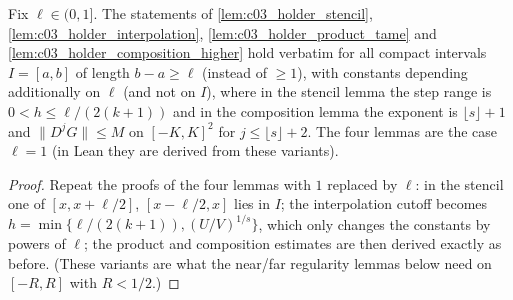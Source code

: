 \begin{lemma}
  \label{lem:c03_holder_tame_len}
  Fix $\ell\in(0,1]$. The statements of \cref{lem:c03_holder_stencil}, \cref{lem:c03_holder_interpolation},
  \cref{lem:c03_holder_product_tame} and \cref{lem:c03_holder_composition_higher} hold verbatim for all
  compact intervals $I=[a,b]$ of length $b-a\ge\ell$ (instead of $\ge1$), with constants depending
  additionally on $\ell$ (and not on $I$), where in the stencil lemma the step range is
  $0<h\le\ell/(2(k+1))$ and in the composition lemma the exponent is $\lfloor s\rfloor+1$ and
  $\|D^jG\|\le M$ on $[-K,K]^2$ for $j\le\lfloor s\rfloor+2$. The four lemmas are the case $\ell=1$ (in Lean they are derived from these variants).
\end{lemma}
\begin{proof}
  Repeat the proofs of the four lemmas with $1$ replaced by $\ell$: in the stencil one of
  $[x,x+\ell/2]$, $[x-\ell/2,x]$ lies in $I$; the interpolation cutoff becomes
  $h=\min\{\ell/(2(k+1)),(U/V)^{1/s}\}$, which only changes the constants by powers of $\ell$;
  the product and composition estimates are then derived exactly as before.
  (These variants are what the near/far regularity lemmas below need on $[-R,R]$ with $R<1/2$.)
\end{proof}

